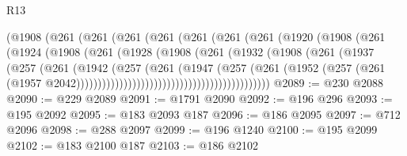 \begin{lexlean}{R13}
\begin{coremodule}
                            (@1908
                              (@261
                                (@261
                                  (@261
                                    (@261
                                      (@261
                                        (@261
                                          (@261
                                            (@1920
                                              (@1908
                                                (@261
                                                  (@1924
                                                    (@1908
                                                      (@261
                                                        (@1928
                                                          (@1908
                                                            (@261
                                                              (@1932
                                                                (@1908
                                                                  (@261
                                                                    (@1937
                                                                      (@257
                                                                        (@261
                                                                          (@1942
                                                                            (@257
                                                                              (@261
                                                                                (@1947
                                                                                  (@257
                                                                                    (@261
                                                                                      (@1952
                                                                                        (@257
                                                                                          (@261
                                                                                            (@1957
                                                                                              @2042)))))))))))))))))))))))))))))))))))))))))))))
@2089 := @230 @2088
@2090 := @229 @2089
@2091 := @1791 @2090
@2092 := @196 @296
@2093 := @195 @2092
@2095 := @183 @2093 @187
@2096 := @186 @2095
@2097 := @712 @2096
@2098 := @288 @2097
@2099 := @196 @1240
@2100 := @195 @2099
@2102 := @183 @2100 @187
@2103 := @186 @2102

\end{coremodule}
\end{lexlean}
